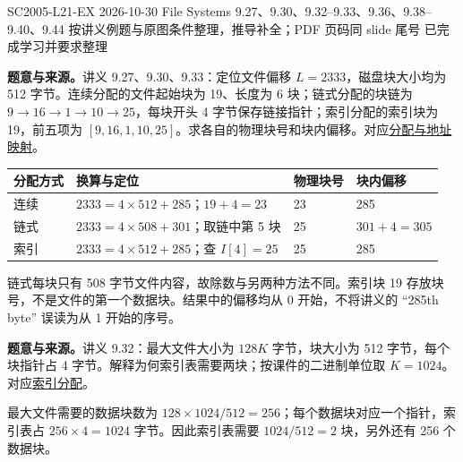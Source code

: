 \begingroup
\renewcommand{\recordid}[1]{}
\renewcommand{\relatedtopic}[2]{\hyperref[topic:#1]{#2}}

\examplemeta
  {SC2005-L21-EX}
  {2026-10-30}
  {File Systems 9.27、9.30、9.32--9.33、9.36、9.38--9.40、9.44}
  {按讲义例题与原图条件整理，推导补全；PDF 页码同 slide 尾号}
  {已完成学习并要求整理}

\linespread{1.15}\selectfont
\setlength{\parskip}{0.4em}

\textbf{题意与来源。}讲义 9.27、9.30、9.33：定位文件偏移 $L=2333$，磁盘块大小均为 512 字节。连续分配的文件起始块为 19、长度为 6 块；链式分配的块链为 $9\to16\to1\to10\to25$，每块开头 4 字节保存链接指针；索引分配的索引块为 19，前五项为 $[9,16,1,10,25]$。求各自的物理块号和块内偏移。对应\relatedtopic{SC2005-L21-T01}{分配与地址映射}。

\begin{workedsolution}
\begin{center}
\begin{tabularx}{\textwidth}{@{}l>{\raggedright\arraybackslash}Xll@{}}
\toprule
分配方式 & 换算与定位 & 物理块号 & 块内偏移 \\
\midrule
连续 & $2333=4\times512+285$；$19+4=23$ & 23 & 285 \\
链式 & $2333=4\times508+301$；取链中第 5 块 & 25 & $301+4=305$ \\
索引 & $2333=4\times512+285$；查 $I[4]=25$ & 25 & 285 \\
\bottomrule
\end{tabularx}
\end{center}
链式每块只有 508 字节文件内容，故除数与另两种方法不同。索引块 19 存放块号，不是文件的第一个数据块。结果中的偏移均从 0 开始，不将讲义的 ``285th byte'' 误读为从 1 开始的序号。
\end{workedsolution}

\textbf{题意与来源。}讲义 9.32：最大文件大小为 $128K$ 字节，块大小为 512 字节，每个块指针占 4 字节。解释为何索引表需要两块；按课件的二进制单位取 $K=1024$。对应\relatedtopic{SC2005-L21-T01}{索引分配}。

\begin{workedsolution}
最大文件需要的数据块数为 $128\times1024/512=256$；每个数据块对应一个指针，索引表占 $256\times4=1024$ 字节。因此索引表需要 $1024/512=\boxed{2}$ 块，另外还有 256 个数据块。
\end{workedsolution}

